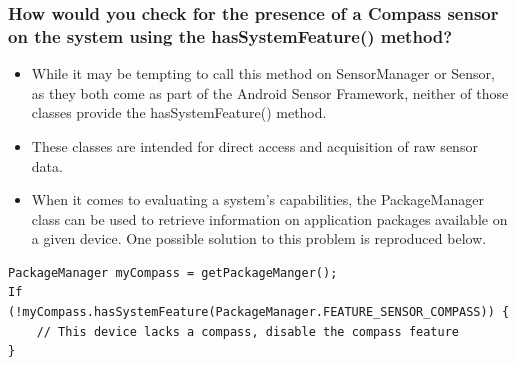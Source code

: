 \documentclass[9pt, b5paper]{article}
\begin{document}
\subsubsection{How would you check for the presence of a Compass sensor on the system using the hasSystemFeature() method?}
\label{sec-1-5-2}
\begin{itemize}
\item While it may be tempting to call this method on SensorManager or Sensor, as they both come as part of the Android Sensor Framework, neither of those classes provide the hasSystemFeature() method.
\item These classes are intended for direct access and acquisition of raw sensor data.
\item When it comes to evaluating a system's capabilities, the PackageManager class can be used to retrieve information on application packages available on a given device. One possible solution to this problem is reproduced below.
\end{itemize}
\begin{verbatim}
PackageManager myCompass = getPackageManger();
If (!myCompass.hasSystemFeature(PackageManager.FEATURE_SENSOR_COMPASS)) {
    // This device lacks a compass, disable the compass feature
}
\end{verbatim}
\end{document}
